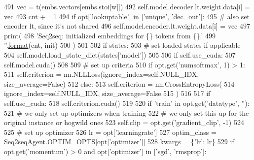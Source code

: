 \begin{DoxyCode}
491                         vec = t(embs.vectors[embs.stoi[w]])
492                         self.model.decoder.lt.weight.data[i] = vec
493                         cnt += 1
494                         \textcolor{keywordflow}{if} opt[\textcolor{stringliteral}{'lookuptable'}] \textcolor{keywordflow}{in} [\textcolor{stringliteral}{'unique'}, \textcolor{stringliteral}{'dec\_out'}]:
495                             \textcolor{comment}{# also set encoder lt, since it's not shared}
496                             self.model.encoder.lt.weight.data[i] = vec
497                 print(
498                     \textcolor{stringliteral}{'Seq2seq: initialized embeddings for \{\} tokens from \{\}.'}
499                     \textcolor{stringliteral}{''}.\hyperlink{namespaceparlai_1_1chat__service_1_1services_1_1messenger_1_1shared__utils_a32e2e2022b824fbaf80c747160b52a76}{format}(cnt, init)
500                 )
501 
502             \textcolor{keywordflow}{if} states:
503                 \textcolor{comment}{# set loaded states if applicable}
504                 self.model.load\_state\_dict(states[\textcolor{stringliteral}{'model'}])
505 
506             \textcolor{keywordflow}{if} self.use\_cuda:
507                 self.model.cuda()
508 
509         \textcolor{comment}{# set up criteria}
510         \textcolor{keywordflow}{if} opt.get(\textcolor{stringliteral}{'numsoftmax'}, 1) > 1:
511             self.criterion = nn.NLLLoss(ignore\_index=self.NULL\_IDX, size\_average=\textcolor{keyword}{False})
512         \textcolor{keywordflow}{else}:
513             self.criterion = nn.CrossEntropyLoss(
514                 ignore\_index=self.NULL\_IDX, size\_average=\textcolor{keyword}{False}
515             )
516 
517         \textcolor{keywordflow}{if} self.use\_cuda:
518             self.criterion.cuda()
519 
520         \textcolor{keywordflow}{if} \textcolor{stringliteral}{'train'} \textcolor{keywordflow}{in} opt.get(\textcolor{stringliteral}{'datatype'}, \textcolor{stringliteral}{''}):
521             \textcolor{comment}{# we only set up optimizers when training}
522             \textcolor{comment}{# we only set this up for the original instance or hogwild ones}
523             self.clip = opt.get(\textcolor{stringliteral}{'gradient\_clip'}, -1)
524 
525             \textcolor{comment}{# set up optimizer}
526             lr = opt[\textcolor{stringliteral}{'learningrate'}]
527             optim\_class = Seq2seqAgent.OPTIM\_OPTS[opt[\textcolor{stringliteral}{'optimizer'}]]
528             kwargs = \{\textcolor{stringliteral}{'lr'}: lr\}
529             \textcolor{keywordflow}{if} opt.get(\textcolor{stringliteral}{'momentum'}) > 0 \textcolor{keywordflow}{and} opt[\textcolor{stringliteral}{'optimizer'}] \textcolor{keywordflow}{in} [\textcolor{stringliteral}{'sgd'}, \textcolor{stringliteral}{'rmsprop'}]:

\end{DoxyCode}
